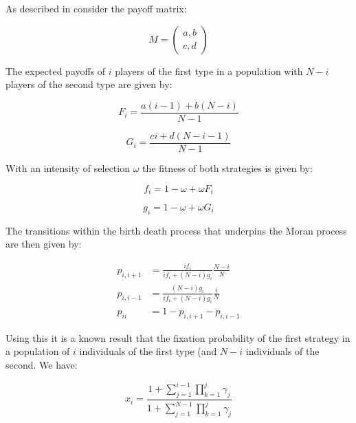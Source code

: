 \documentclass{article}
\begin{document}
As described in \cite{Nowak} consider the payoff matrix:

\begin{equation}\label{equ:payoff_matrix}
    M = \begin{pmatrix}
        a, b\\
        c, d
        \end{pmatrix}
\end{equation}

The expected payoffs of \(i\) players of the first type in a population with \(N
- i\) players of the second type are given by:

\begin{equation}\label{equ:expected_payoff_one}
    F_i = \frac{a(i - 1) + b(N - i)}{N - 1}
\end{equation}

\begin{equation}\label{equ:expected_payoff_two}
    G_i = \frac{ci + d(N - i - 1)}{N - 1}
\end{equation}

With an intensity of selection \(\omega\) the fitness of both strategies is
given by:

\begin{equation}\label{equ:expected_payoff_one}
    f_i = 1 - \omega + \omega F_i
\end{equation}

\begin{equation}\label{equ:expected_payoff_two}
    g_i = 1 - \omega + \omega G_i
\end{equation}

The transitions within the birth death process that underpins the Moran process
are then given by:

\begin{align}
    p_{i, i+1}&= \frac{if_i}{if_i+(N-i)g_i}\frac{N-i}{N}\label{equ:p_up}\\
    p_{i, i-1}&= \frac{(N-i)g_i}{if_i+(N-i)g_i}\frac{i}{N}\label{equ:p_down}\\
    p_{ii} &= 1 - p_{i, i+1} - p_{i, i-1}\label{equ:p_stay}
\end{align}

Using this it is a known result that the fixation probability of the first
strategy in a population of \(i\) individuals of the first type (and \(N-i\)
individuals of the second. We have:

\begin{equation}\label{equ:fixation_probability}
x_i = \frac{1 + \sum_{j=1}^{i-1}\prod_{k=1}^{j}\gamma_j}{1 + \sum_{j=1}^{N-1}
      \prod_{k=1}^{j}\gamma_j}
\end{equation}
\end{document}
